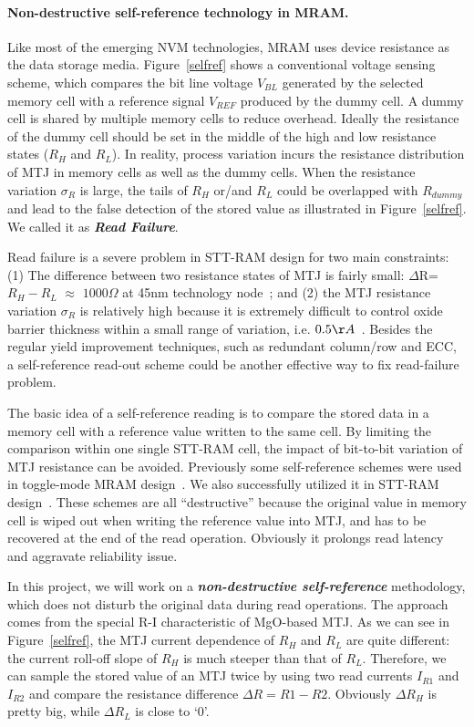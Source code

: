 \paragraph{Non-destructive self-reference technology in MRAM.} Like most of the emerging NVM technologies, MRAM uses device resistance as the data storage media. Figure~\ref{selfref} shows a conventional voltage sensing scheme, which compares the bit line voltage $V_{BL}$ generated by the selected memory cell with a reference signal $V_{REF}$ produced by the dummy cell. A dummy cell is shared by multiple memory cells to reduce overhead. Ideally the resistance of the dummy cell should be set in the middle of the high and low resistance states ($R_H$ and $R_L$). In reality, process variation incurs the resistance distribution of MTJ in memory cells as well as the dummy cells. When the resistance variation $\sigma_R$ is large, the tails of $R_H$ or/and $R_L$ could be overlapped with $R_{dummy}$ and lead to the false detection of the stored value as illustrated in Figure~\ref{selfref}. We called it as \textbf{\emph{Read Failure}}.

Read failure is a severe problem in STT-RAM design for two main constraints: (1) The difference between two resistance states of MTJ is fairly small: $\Delta$R=$R_H-R_L$ $\approx$ $1000\Omega$ at 45nm technology node~\cite{Li09}; and (2) the MTJ resistance variation $\sigma_R$ is relatively high because it is extremely difficult to control oxide barrier thickness within a small range of variation, i.e. $0.5{\AA}$~\cite{Jeong03}. Besides the regular yield improvement techniques, such as redundant column/row and ECC, a self-reference read-out scheme could be another effective way to fix read-failure problem.

The basic idea of a self-reference reading is to compare the stored data in a memory cell with a reference value written to the same cell. By limiting the comparison within one single STT-RAM cell, the impact of bit-to-bit variation of MTJ resistance can be avoided. Previously some self-reference schemes were used in toggle-mode MRAM design~\cite{MRAM:TTO+06,Jeong03}. We also successfully utilized it in STT-RAM design~\cite{Li:147723}. These schemes are all ``destructive'' because the original value in memory cell is wiped out when writing the reference value into MTJ, and has to be recovered at the end of the read operation. Obviously it prolongs read latency and aggravate reliability issue.

In this project, we will work on a \textbf{\textit{non-destructive self-reference}} methodology, which does not disturb the original data during read operations. The approach comes from the special R-I characteristic of MgO-based MTJ. As we can see in Figure~\ref{selfref}, the MTJ current dependence of $R_H$ and $R_L$ are quite different: the current roll-off slope of $R_H$ is much steeper than that of $R_L$. Therefore, we can sample the stored value of an MTJ twice by using two read currents $I_{R1}$ and $I_{R2}$ and compare the resistance difference ${\Delta}R=R1-R2$. Obviously ${\Delta}R_H$ is pretty big, while ${\Delta}R_L$ is close to `0'.


